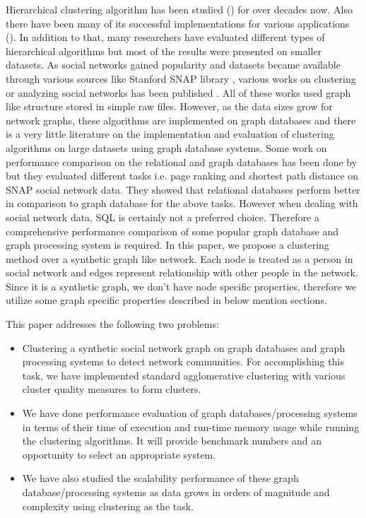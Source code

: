 \documentclass[11pt,onecolumn]{article}
\begin{document}
Hierarchical clustering algorithm has been studied (\cite{WillHerb}\cite{Chris}\cite{CFO}) for over decades now. Also there have been many of its successful implementations for various applications (\cite{SteinKar}\cite{ZhaoKar}). In addition to that, many researchers have evaluated different types of hierarchical algorithms but most of the results were presented on smaller datasets. 
As social networks gained popularity and datasets became available through various sources like Stanford SNAP library \cite{snap}, various works on clustering or analyzing social networks has been published \cite{MishraSchrei}\cite{Held}. All of these works used graph like structure stored in simple raw files. However, as the data sizes grow for network graphs, these algorithms are implemented on graph databases and there is a very little literature \cite{GuhaRat} on the implementation and evaluation of clustering algorithms on large datasets using graph database systems. 
Some work on performance comparison on the relational and graph databases has been done by \cite{benchmark} but they evaluated different tasks i.e. page ranking and shortest path distance on SNAP social network data. They showed that relational databases perform better in comparison to graph database for the above tasks. However when dealing with social network data, SQL is certainly not a preferred choice. Therefore a comprehensive performance comparison of some popular graph database and graph processing system is required.
In this paper, we propose a clustering method over a synthetic graph like network. Each node is treated as a person in social network and edges represent relationship with other people in the network. Since it is a synthetic graph, we don’t have node specific properties, therefore we utilize some graph specific properties described in below mention sections.

This paper addresses the following two problems:
\begin{itemize}
\item
Clustering a synthetic social network graph on graph databases and graph processing systems to detect network communities. For accomplishing this task, we have implemented standard agglomerative clustering with various cluster quality measures to form clusters.
\item
We have done performance evaluation of graph databases/processing systems in terms of their time of execution and run-time memory usage while running the clustering algorithms. It will provide benchmark numbers and an opportunity to select an appropriate system.
\item
We have also studied the scalability performance of these graph database/processing systems as data grows in orders of magnitude and complexity using clustering as the task.
\end{itemize}
\end{document}
